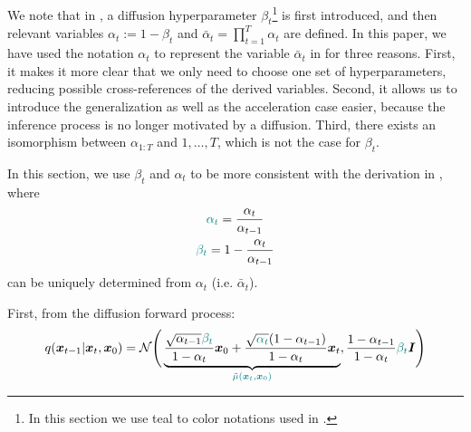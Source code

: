 We note that in \citet{ho2020denoising}, a diffusion hyperparameter {\color{teal} $\beta_t$}\footnote{In this section we use teal to color notations used in \citet{ho2020denoising}.} is first introduced, and then relevant variables {\color{teal}$\alpha_t := 1 - \beta_t$} and {\color{teal}$\bar{\alpha}_t = \prod_{t=1}^{T} \alpha_t$} are defined. In this paper, we have used the notation $\alpha_{t}$ to represent the variable {\color{teal} $\bar{\alpha}_t$} in \citet{ho2020denoising} for three reasons. First, it makes it more clear that we only need to choose one set of hyperparameters, reducing possible cross-references of the derived variables. Second, it allows us to introduce the generalization as well as the acceleration case easier, because the inference process is no longer motivated by a diffusion. Third, there exists an isomorphism between $\alpha_{1:T}$ and $1, \ldots, T$, which is not the case for {\color{teal} $\beta_t$}.

In this section, we use {\color{teal} $\beta_t$} and {\color{teal} $\alpha_t$} to be more consistent with the derivation in \citet{ho2020denoising}, where
\begin{gather}
{\color{teal} \alpha_t} = \frac{\alpha_t}{\alpha_{t-1}} \\
    {\color{teal} \beta_t} = 1 - \frac{\alpha_t}{\alpha_{t-1}} 
\end{gather}
can be uniquely determined from $\alpha_t$ (i.e. {\color{teal}$\bar{\alpha}_t$}).

First, from the diffusion forward process:
\begin{align}
    q(\bm{x}_{t-1} | \bm{x}_t, \bm{x}_0) = \mathcal{N}\Bigg(\underbrace{\frac{\sqrt{\alpha_{t-1}}{\color{teal} \beta_t}}{1 - \alpha_t} \bm{x}_0 + \frac{\sqrt{{\color{teal} \alpha_t}} (1 - \alpha_{t-1})}{1 - \alpha_t} \bm{x}_t}_{\color{teal} \tilde{\mu}(\bm{x}_t, \bm{x}_0)}, \frac{1 - \alpha_{t-1}}{1 - \alpha_t} {\color{teal} \beta_t}\bm{I}\Bigg) \nonumber
\end{align}



